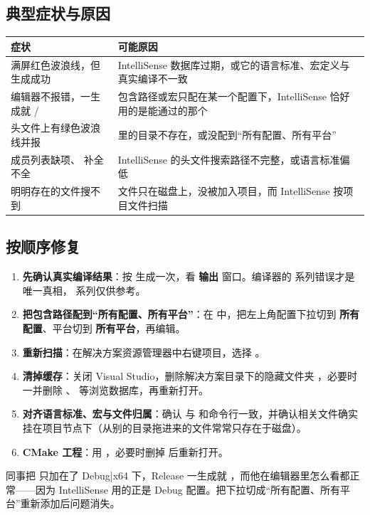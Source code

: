 \subsection{典型症状与原因}
\begin{longtable}{L{6.2cm}L{8.6cm}}
\toprule
\textbf{症状} & \textbf{可能原因} \\
\midrule
满屏红色波浪线，但生成成功 & IntelliSense 数据库过期，或它的语言标准、宏定义与真实编译不一致 \\
编辑器不报错，一生成就 / & 包含路径或宏只配在某一个配置下，IntelliSense 恰好用的是能通过的那个 \\
头文件上有绿色波浪线并报  &  里的目录不存在，或没配到“所有配置、所有平台” \\
成员列表缺项、 补全不全 & IntelliSense 的头文件搜索路径不完整，或语言标准偏低 \\
明明存在的文件搜不到 & 文件只在磁盘上，没被加入项目，而 IntelliSense 按项目文件扫描 \\
\bottomrule
\end{longtable}
\subsection{按顺序修复}
\begin{enumerate}
  \item \textbf{先确认真实编译结果}：按  生成一次，看 \textbf{输出} 窗口。编译器的  系列错误才是唯一真相， 系列仅供参考。
  \item \textbf{把包含路径配到“所有配置、所有平台”}：在  中，把左上角配置下拉切到 \textbf{所有配置}、平台切到 \textbf{所有平台}，再编辑。
  \item \textbf{重新扫描}：在解决方案资源管理器中右键项目，选择 。
  \item \textbf{清掉缓存}：关闭 Visual Studio，删除解决方案目录下的隐藏文件夹 ，必要时一并删除 、 等浏览数据库，再重新打开。
  \item \textbf{对齐语言标准、宏与文件归属}：确认  与  和命令行一致，并确认相关文件确实挂在项目节点下（从别的目录拖进来的文件常常只存在于磁盘）。
  \item \textbf{CMake 工程}：用 ，必要时删掉  后重新打开。
\end{enumerate}
\begin{keybox}[实战场景]
同事把  只加在了 Debug|x64 下，Release 一生成就 ，而他在编辑器里怎么看都正常——因为 IntelliSense 用的正是 Debug 配置。把下拉切成“所有配置、所有平台”重新添加后问题消失。
\end{keybox}
